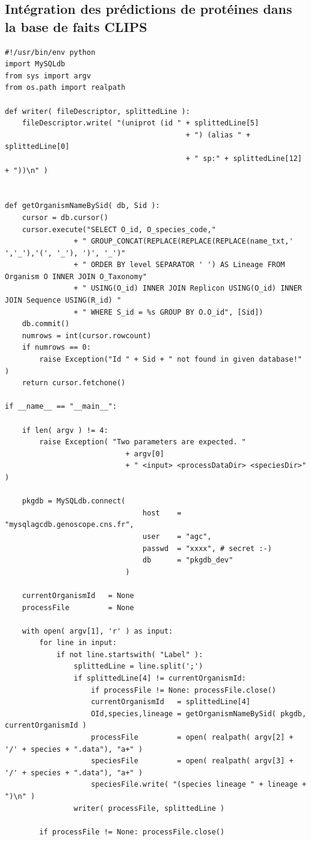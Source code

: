 \subsection{Intégration des prédictions de protéines dans la base de faits CLIPS}
\begin{lstlisting}[style=python-style,caption=getProteinFacts.py]
#!/usr/bin/env python
import MySQLdb
from sys import argv
from os.path import realpath

def writer( fileDescriptor, splittedLine ):
    fileDescriptor.write( "(uniprot (id " + splittedLine[5]
                                          + ") (alias " + splittedLine[0]
                                          + " sp:" + splittedLine[12]  + "))\n" )


def getOrganismNameBySid( db, Sid ):
    cursor = db.cursor()
    cursor.execute("SELECT O_id, O_species_code,"
                + " GROUP_CONCAT(REPLACE(REPLACE(REPLACE(name_txt,' ','_'),'(', '_'), ')', '_')"
                + " ORDER BY level SEPARATOR ' ') AS Lineage FROM Organism O INNER JOIN O_Taxonomy"
                + " USING(O_id) INNER JOIN Replicon USING(O_id) INNER JOIN Sequence USING(R_id) "
                + " WHERE S_id = %s GROUP BY O.O_id", [Sid])
    db.commit()
    numrows = int(cursor.rowcount)
    if numrows == 0:
        raise Exception("Id " + Sid + " not found in given database!" )
    return cursor.fetchone()

if __name__ == "__main__":

    if len( argv ) != 4:
        raise Exception( "Two parameters are expected. "
        					+ argv[0]
        					+ " <input> <processDataDir> <speciesDir>" )

    pkgdb = MySQLdb.connect(
                                host    = "mysqlagcdb.genoscope.cns.fr",
                                user    = "agc", 
                                passwd  = "xxxx", # secret :-)
                                db      = "pkgdb_dev"
                            )

    currentOrganismId   = None
    processFile         = None

    with open( argv[1], 'r' ) as input:
        for line in input:
            if not line.startswith( "Label" ):
                splittedLine = line.split(';')
                if splittedLine[4] != currentOrganismId:
                    if processFile != None: processFile.close() 
                    currentOrganismId   = splittedLine[4]
                    OId,species,lineage = getOrganismNameBySid( pkgdb, currentOrganismId )
                    processFile         = open( realpath( argv[2] + '/' + species + ".data"), "a+" )
                    speciesFile         = open( realpath( argv[3] + '/' + species + ".data"), "a+" )
                    speciesFile.write( "(species lineage " + lineage + ")\n" )
                writer( processFile, splittedLine ) 

        if processFile != None: processFile.close()
\end{lstlisting}

